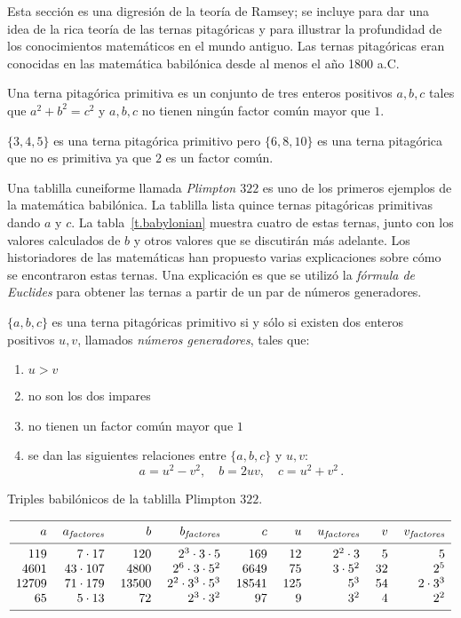 Esta sección es una digresión de la teoría de Ramsey; se incluye para dar una idea de la rica teoría de las ternas pitagóricas y para illustrar la profundidad de los conocimientos matemáticos en el mundo antiguo. Las ternas pitagóricas eran conocidas en las matemática babilónica desde al menos el año 1800 a.C.
\begin{definition}
Una terna pitagórica primitiva es un conjunto de tres enteros positivos ${a,b,c}$ tales que $a^2+b^2=c^2$ y $a,b,c$ no tienen ningún factor común mayor que $1$.
\end{definition}
\begin{example}
$\{3,4,5\}$ es una terna pitagórica primitivo pero $\{6,8,10\}$ es una terna pitagórica que no es primitiva ya que $2$ es un factor común.
\end{example}
Una tablilla cuneiforme llamada \emph{Plimpton $322$} es uno de los primeros ejemplos de la matemática babilónica. La tablilla lista quince ternas pitagóricas primitivas dando $a$ y $c$. La tabla~\ref{t.babylonian} muestra cuatro de estas ternas, junto con los valores calculados de $b$ y otros valores que se discutirán más adelante. Los historiadores de las matemáticas han propuesto varias explicaciones sobre cómo se encontraron estas ternas. Una explicación es que se utilizó la \emph{fórmula de Euclides} para obtener las ternas a partir de un par de números generadores.
\begin{theorem}[Euclid]
$\{a,b,c\}$ es una terna pitagóricas primitivo si y sólo si existen dos enteros positivos $u,v$, llamados \emph{números generadores}, tales que:\label{thm.euclid-function}
\begin{enumerate}
\item $u>v$
\item no son los dos impares
\item no tienen un factor común mayor que $1$
\item se dan las siguientes relaciones entre $\{a,b,c\}$ y $u,v$:
\[
a=u^2-v^2,\quad b=2uv,\quad c=u^2+v^2\,.
\]
\end{enumerate}
\end{theorem}

\begin{table}[b]
\caption{Triples babilónicos de la tablilla Plimpton $322$.}\label{t.babylonian}
\[
\begin{array}{r@{$\quad\;$}r@{$\quad\;$}r@{$\quad\;$}r@{$\quad\;$}r@{$\quad\;$}r@{$\quad\;$}r@{$\quad\;$}r@{$\quad\;$}r}
\hline
\noalign{\smallskip}
a&a_{\textit{factores}}&b&b_{\textit{factores}}&c&u&u_{\textit{factores}}&v&v_{\textit{factores}}\\
\noalign{\smallskip}\hline\noalign{\smallskip}
119&7\cdot 17 &120&2^3 \cdot 3\cdot 5 & 169&12&2^2\cdot 3&5&5\\
4601 &43\cdot 107&4800&2^6 \cdot 3 \cdot 5^2& 6649&75&3\cdot 5^2&32&2^5\\
12709 &71\cdot 179&13500&2^2 \cdot 3^3 \cdot 5^3& 18541&125&5^3&54&2\cdot 3^3\\
65 &5\cdot 13&72&2^3 \cdot 3^2 & 97&9&3^2&4&2^2\\
\noalign{\smallskip}\hline
\end{array}
\]
\end{table}


